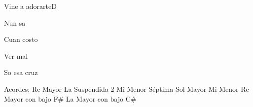 \documentclass[12pt, spanish]{book}
\begin{document}
\begin{song}{Vine a adorarte}{D}
        \begin{SBOpGroup}
            Nun sa

            Cuan costo

            Ver  mal

            So esa cruz
        \end{SBOpGroup}

        \ifChordBk
        \begin{SBOpGroup}
            Acordes:\break
            \upchord{\D}\qquad Re Mayor \hfill
            \upchord{\Asustwo}\qquad La Suspendida 2 \hfill\null\break
            \upchord{\Emseven}\qquad Mi Menor S\'eptima \hfill
            \upchord{\G}\qquad Sol Mayor \hfill\null\break
            \upchord{\Em}\qquad Mi Menor \hfill
            \upchord{\DFs}\qquad Re Mayor con bajo F\# \hfill\null\break
            \upchord{\ACs}\qquad La Mayor con bajo C\# \hfill\null\break
        \end{SBOpGroup}
        \fi
    \end{song}
\end{document}
